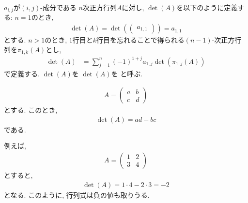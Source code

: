  \begin{definition}
    $a_{i,j}$が$(i,j)$-成分である
    $n$次正方行列$A$に対し,
    $\det(A)$を以下のように定義する:
    $n=1$のとき,
    \begin{align*}
      \det(A)=\det(\begin{pmatrix}a_{1,1}\end{pmatrix})=a_{1,1}
    \end{align*}
    とする.
    $n>1$のとき,
    $1$行目と$k$行目を忘れることで得られる$(n-1)$-次正方行列を$\pi_{1,k}(A)$とし,
    \begin{align*}
      \det(A)&=\sum_{j=1}^{n}
      (-1)^{1+j}a_{1,j}\det(\pi_{1,j}(A))
    \end{align*}
    で定義する.
    $\det(A)$を
      $\det(A)$を
  と呼ぶ.
  \end{definition}



\begin{example}
  \begin{align*}
    A=
  \begin{pmatrix}
    a&b\\c&d
  \end{pmatrix}
  \end{align*}
  とする.  このとき,
  \begin{align*}
    \det(A)=ad-bc
  \end{align*}
  である.
  
  例えば,
  \begin{align*}
    A=\begin{pmatrix}1&2\\3&4\end{pmatrix}
  \end{align*}
  とすると,
  \begin{align*}
    \det(A)=1\cdot 4 -2\cdot 3=-2
  \end{align*}
  となる.
  このように, 行列式は負の値も取りうる.
\end{example}





